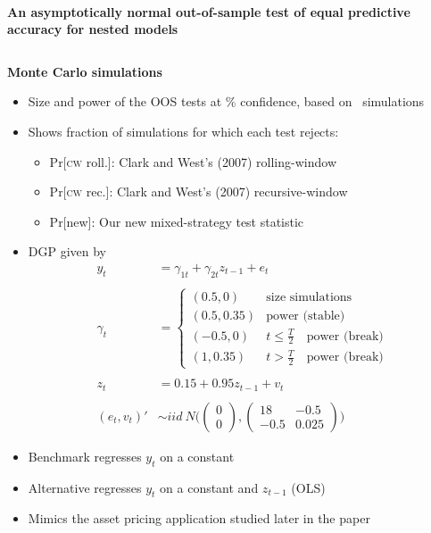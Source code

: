 \documentclass[final]{beamer}
\begin{document}
\begin{frame}{\\\centering \textbf{\huge An asymptotically normal out-of-sample
    test of equal predictive accuracy for nested models}}
\begin{columns}[t]
    \begin{column}{.23\linewidth}
      \begin{block}{\textbf{Monte Carlo simulations}}
        \smallskip
        \bigskip
        {
          \footnotesize
          
        }
        \begin{itemize}
        \item Size and power of the OOS tests at \testsize\%
          confidence, based on \totalsims\ simulations
        \item Shows fraction of simulations for which each test rejects:
          \begin{itemize}
          \item Pr[\textsc{cw} roll.]: Clark and West's (2007)
            rolling-window
          \item Pr[\textsc{cw} rec.]: Clark and West's (2007)
            recursive-window
          \item Pr[new]: Our new mixed-strategy test statistic
          \end{itemize}
        \item DGP given by
          \begin{align*}
            y_t &= \gamma_{1t} + \gamma_{2t} z_{t-1} + e_t \\\\
            \gamma_t &=
            \begin{cases}
              (0.5, 0)    & \text{size simulations} \\
              (0.5, 0.35) & \text{power (stable)} \\
              (-0.5, 0)    & t \leq \tfrac{T}{2} \quad \text{power (break)} \\
              (1, 0.35) & t > \tfrac{T}{2} \quad \text{power (break)}
            \end{cases}\\\\
            z_t &= 0.15 + 0.95 z_{t-1} + v_t \\\\
            (e_t, v_t)' &\sim iid\ N\Bigg(\begin{pmatrix} 0 \\ 0
            \end{pmatrix}
            , \begin{pmatrix} 18 & -
              0.5 \\ -0.5 & 0.025 \end{pmatrix}\Bigg)
          \end{align*}
        \item Benchmark regresses $y_t$ on a constant
        \item Alternative regresses $y_t$ on a constant and $z_{t-1}$ (OLS)
        \item Mimics the asset pricing application studied later in the paper
          \citep{GoW:08}
        \end{itemize}
      \end{block}
    \end{column}


\end{columns}
\end{frame}
\end{document}
